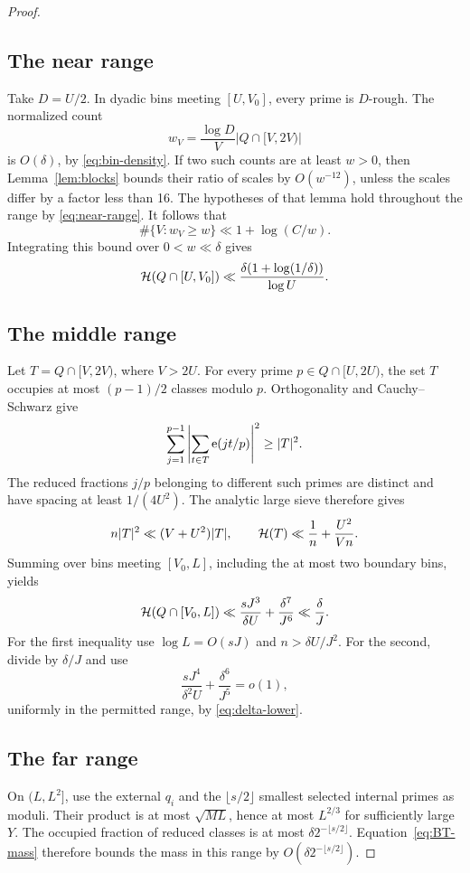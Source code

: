 \begin{proof}
\subsection*{The near range}
Take \(D=U/2\). In dyadic bins meeting \([U,V_0]\), every
prime is \(D\)-rough. The normalized count
\[
 w_V=\frac{\log D}{V}|Q\cap[V,2V)|
\]
is \(O(\delta)\), by \eqref{eq:bin-density}.
If two such counts are at least \(w>0\), then
Lemma~\ref{lem:blocks} bounds their ratio of scales by
\(O(w^{-12})\), unless the scales differ by a factor less
than 16. The hypotheses of that lemma hold throughout
the range by \eqref{eq:near-range}.
It follows that
\[
 \#\{V:w_V\ge w\}\ll1+\log(C/w).
\]
Integrating this bound over \(0<w\ll\delta\) gives
\begin{equation}\label{eq:near-mass}
 \mathcal H(Q\cap[U,V_0])
 \ll\frac{\delta(1+\log(1/\delta))}{\log U}.
\end{equation}

\subsection*{The middle range}
Let \(T=Q\cap[V,2V)\), where \(V>2U\).
For every prime \(p\in Q\cap[U,2U)\), the set \(T\)
occupies at most \((p-1)/2\) classes modulo \(p\).
Orthogonality and Cauchy--Schwarz give
\[
 \sum_{j=1}^{p-1}
      \left|\sum_{t\in T}\mathrm e(jt/p)\right|^2
 \ge |T|^2.
\]
The reduced fractions \(j/p\) belonging to different such
primes are distinct and have spacing at least \(1/(4U^2)\).
The analytic large sieve therefore gives
\[
 n|T|^2\ll(V+U^2)|T|,
 \qquad
 \mathcal H(T)\ll\frac1n+\frac{U^2}{Vn}.
\]
Summing over bins meeting \([V_0,L]\), including the
at most two boundary bins, yields
\begin{equation}\label{eq:middle-mass}
 \mathcal H(Q\cap[V_0,L])
 \ll\frac{sJ^3}{\delta U}+\frac{\delta^7}{J^6}
 \ll\frac{\delta}{J}.
\end{equation}
For the first inequality use \(\log L=O(sJ)\) and
\(n>\delta U/J^2\). For the second, divide by
\(\delta/J\) and use
\[
 \frac{sJ^4}{\delta^2U}+\frac{\delta^6}{J^5}=o(1),
\]
uniformly in the permitted range, by \eqref{eq:delta-lower}.

\subsection*{The far range}
On \((L,L^2]\), use the external \(q_i\) and the
\(\lfloor s/2\rfloor\) smallest selected internal primes as
moduli. Their product is at most \(\sqrt{ML}\), hence at
most \(L^{2/3}\) for sufficiently large \(Y\). The occupied
fraction of reduced classes is at most
\(\delta2^{-\lfloor s/2\rfloor}\). Equation~\eqref{eq:BT-mass}
therefore bounds the mass in this range by
\(O(\delta2^{-\lfloor s/2\rfloor})\).


\end{proof}
